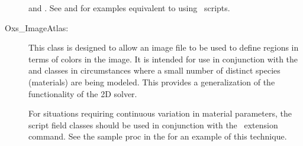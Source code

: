 \begin{description}
\begin{ExampleMifs}
   and .  See
   and  for
  examples equivalent to  using \Tcl\ scripts.
\end{ExampleMifs}

\item[Oxs\_ImageAtlas:\label{HTMLoxsImageAtlas}]%
%
This class is designed to allow an image file
to be used to define regions in terms of colors in the image.  It is
intended for use in conjunction with the  and
 classes in circumstances where a small
number of distinct species (materials) are being modeled.  This provides
a generalization of the 
functionality of the 2D solver.

For situations requiring continuous variation in material parameters,
the script field classes should be used in conjunction with the
 \MIF\ extension command.  See the
 sample proc in the   for an example of this
technique.


\end{description}
